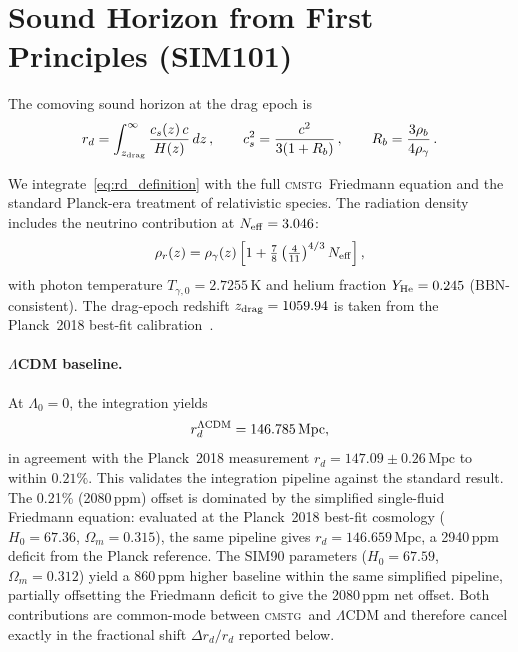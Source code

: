 \documentclass[12pt,a4paper]{article}
\newcommand{\CMSTG}{\textsc{cmstg}}
\newcommand{\Lz}{\Lambda_0}
\begin{document}
\section{Sound Horizon from First Principles (SIM101)}
\label{sec:sound-horizon}

The comoving sound horizon at the drag epoch is
\begin{equation}
  r_d = \int_{z_{\rm drag}}^{\infty} \frac{c_s(z)\,c}{H(z)}\,dz\,,
  \qquad
  c_s^2 = \frac{c^2}{3(1 + R_b)}\,,\qquad
  R_b = \frac{3\rho_b}{4\rho_\gamma}\,.
  \label{eq:rd_definition}
\end{equation}

We integrate~\eqref{eq:rd_definition} with the full \CMSTG\ Friedmann equation
and the standard Planck-era treatment of relativistic species. The radiation
density includes the neutrino contribution at $N_{\rm eff} = 3.046$:
\begin{equation}
  \rho_r(z) = \rho_\gamma(z) \left[ 1 + \tfrac{7}{8}
  \left(\tfrac{4}{11}\right)^{4/3} N_{\rm eff} \right],
\end{equation}
with photon temperature $T_{\gamma,0} = 2.7255\,$K and helium fraction
$Y_{\rm He} = 0.245$ (BBN-consistent). The drag-epoch redshift
$z_{\rm drag} = 1059.94$ is taken from the Planck~2018 best-fit
calibration~\cite{Planck2018}.

\paragraph{$\Lambda$CDM baseline.}
At $\Lz = 0$, the integration yields
\begin{equation}
  r_d^{\Lambda{\rm CDM}} = 146.785\,\mathrm{Mpc},
\end{equation}
in agreement with the Planck~2018 measurement $r_d = 147.09 \pm 0.26\,\mathrm{Mpc}$
to within $0.21\%$. This validates the integration pipeline against the standard
result. The 0.21\% (2080\,ppm) offset is dominated by the simplified single-fluid
Friedmann equation: evaluated at the Planck~2018 best-fit cosmology
($H_0 = 67.36$, $\Omega_m = 0.315$), the same pipeline gives
$r_d = 146.659\,\mathrm{Mpc}$, a 2940\,ppm deficit from the Planck reference.
The SIM90 parameters ($H_0 = 67.59$, $\Omega_m = 0.312$) yield a 860\,ppm
higher baseline within the same simplified pipeline, partially offsetting the
Friedmann deficit to give the 2080\,ppm net offset. Both contributions are
common-mode between \CMSTG\ and $\Lambda$CDM and therefore cancel exactly in
the fractional shift $\Delta r_d/r_d$ reported below.
\end{document}
